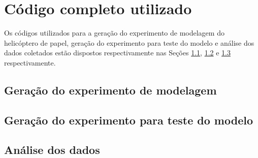 \chapter{Código completo utilizado}
\label{chap:app_codigo_completo_utilizado}

Os códigos utilizados para a geração do experimento de modelagem do helicóptero de papel, geração do experimento para teste do modelo e análise dos dados coletados estão dispostos respectivamente nas Seções \ref{sec:app_codigo_geracao_do_experimento_de_modelagem}, \ref{sec:app_codigo_geracao_do_experimento_para_teste_do_modelo} e \ref{sec:app_codigo_analise_dos_dados} respectivamente.

\section{Geração do experimento de modelagem}
\label{sec:app_codigo_geracao_do_experimento_de_modelagem}




\section{Geração do experimento para teste do modelo}
\label{sec:app_codigo_geracao_do_experimento_para_teste_do_modelo}




\section{Análise dos dados}
\label{sec:app_codigo_analise_dos_dados}

